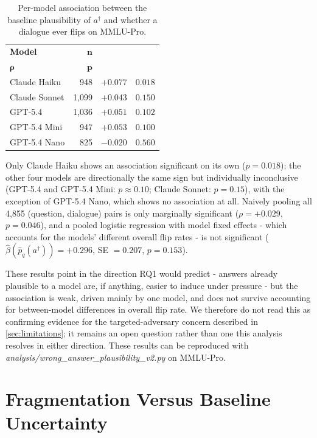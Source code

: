\begin{table}[t]
\centering
\footnotesize
\setlength{\tabcolsep}{3.5pt}
\renewcommand{\arraystretch}{1.08}

\caption{Per-model association between the baseline plausibility of
$a^\dagger$ and whether a dialogue ever flips on MMLU-Pro.}
\label{tab:plausibility}

\begin{tabular}{@{}lrrr@{}}
\toprule
\textbf{Model}
& $\boldsymbol{n}$
& \makecell{\textbf{Spearman}\\$\boldsymbol{\rho}$}
& $\boldsymbol{p}$ \\
\midrule
Claude Haiku
& 948 & $+0.077$ & $0.018$ \\
Claude Sonnet
& 1{,}099 & $+0.043$ & $0.150$ \\
GPT-5.4
& 1{,}036 & $+0.051$ & $0.102$ \\
GPT-5.4 Mini
& 947 & $+0.053$ & $0.100$ \\
GPT-5.4 Nano
& 825 & $-0.020$ & $0.560$ \\
\bottomrule
\end{tabular}
\end{table}

Only Claude Haiku shows an association significant on its own
($p=0.018$); the other four models are directionally the same sign but
individually inconclusive (GPT-5.4 and GPT-5.4 Mini: $p\approx0.10$;
Claude Sonnet: $p=0.15$), with the exception of GPT-5.4 Nano, which
shows no association at all. Naively pooling all 4{,}855 (question,
dialogue) pairs is only marginally significant ($\rho=+0.029$,
$p=0.046$), and a pooled logistic regression with model fixed effects -
which accounts for the models' different overall flip rates - is not
significant ($\hat{\beta}\!\left(\hat{p}_q(a^\dagger)\right)=+0.296$,
SE $=0.207$, $p=0.153$).

These results point in the direction RQ1 would predict - answers
already plausible to a model are, if anything, easier to induce under
pressure - but the association is weak, driven mainly by one model,
and does not survive accounting for between-model differences in
overall flip rate. We therefore do not read this as confirming evidence
for the targeted-adversary concern described in \autoref{sec:limitations};
it remains an open question rather than one this analysis resolves in
either direction. These results can be reproduced with
\emph{analysis/wrong\_answer\_plausibility\_v2.py} on MMLU-Pro.

\section{Fragmentation Versus Baseline Uncertainty}
\label{app:fragmentation}

